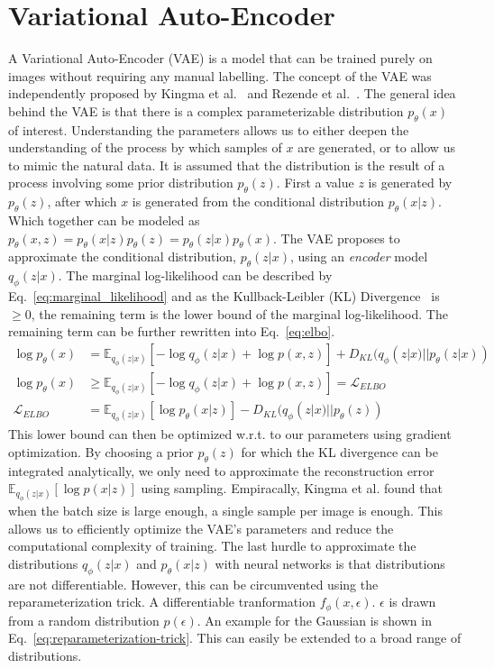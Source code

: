 \section{Variational Auto-Encoder}
A Variational Auto-Encoder (VAE) is a model that can be trained purely on images without requiring any manual labelling. The concept of the VAE was independently proposed by Kingma et al.~\cite{kingma2014autoencodingvariationalbayes} and Rezende et al.~\cite{rezende2014stochastic}. The general idea behind the VAE is that there is a complex parameterizable distribution $p_\theta(x)$ of interest. Understanding the parameters allows us to either deepen the understanding of the process by which samples of $x$ are generated, or to allow us to mimic the natural data. It is assumed that the distribution is the result of a process involving some prior distribution $p_\theta(z)$. First a value $z$ is generated by $p_\theta(z)$, after which $x$ is generated from the conditional distribution $p_\theta(x | z)$. Which together can be modeled as $p_\theta(x, z) = p_\theta(x|z)p_\theta(z) = p_\theta(z|x)p_\theta(x)$. The VAE proposes to approximate the conditional distribution, $p_\theta(z|x)$, using an \emph{encoder} model $q_\phi(z|x)$. The marginal log-likelihood can be described by Eq.~\ref{eq:marginal_likelihood} and as the Kullback-Leibler (KL) Divergence~\cite{kullback1951information} is $\geq 0$, the remaining term is the lower bound of the marginal log-likelihood. The remaining term can be further rewritten into Eq.~\ref{eq:elbo}.
\begin{subequations}
    \begin{align}
        \log p_\theta(x)   & = \mathbb{E}_{q_{\phi}(z|x)}[-\log q_\phi(z|x) + \log p(x,z)] + D_{KL}(q_{\phi}(z|x) || p_\theta(z|x))\label{eq:marginal_likelihood} \\
        \log p_\theta(x)   & \geq \mathbb{E}_{q_{\phi}(z|x)}[-\log q_\phi(z|x) + \log p(x,z)] = \mathcal{L}_{ELBO}                                                \\
        \mathcal{L}_{ELBO} & = \mathbb{E}_{q_{\phi}(z|x)}[\log p_\theta(x|z)] - D_{KL}(q_{\phi}(z|x) || p_\theta(z))\label{eq:elbo}
    \end{align}
\end{subequations}
This lower bound can then be optimized w.r.t. to our parameters using gradient optimization. By choosing a prior $p_\theta(z)$ for which the KL divergence can be integrated analytically, we only need to approximate the reconstruction error $\mathbb{E}_{q_{\phi}(z|x)}[\log p(x|z)]$ using sampling. Empiracally, Kingma et al. found that when the batch size is large enough, a single sample per image is enough. This allows us to efficiently optimize the VAE's parameters and reduce the computational complexity of training. The last hurdle to approximate the distributions $q_{\phi}(z | x)$ and $p_{\theta}(x | z)$ with neural networks is that distributions are not differentiable. However, this can be circumvented using the reparameterization trick. A differentiable tranformation $f_\phi(x, \epsilon)$. $\epsilon$ is drawn from a random distribution $p(\epsilon)$. An example for the Gaussian is shown in Eq.~\ref{eq:reparameterization-trick}. This can easily be extended to a broad range of distributions.
